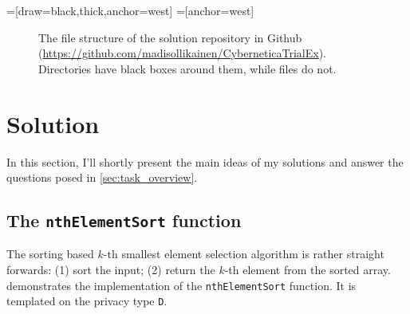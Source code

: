 \documentclass[11pt]{article}
\newcommand{\ct}[1]{\texttt{#1}}
\begin{document}
=[draw=black,thick,anchor=west]
=[anchor=west]
\begin{figure}[h]
\centering
\caption{The file structure of the solution repository in Github (\url{https://github.com/madisollikainen/CyberneticaTrialEx}). Directories have black boxes around them, while files do not.}
\label{fig:solution_file_structure}
\end{figure}




\section{Solution} %
\label{sec:solutions}

In this section, I'll shortly present the main ideas of my solutions and answer the questions posed in \cref{sec:task_overview}. 

\subsection{The \ct{nthElementSort} function} %
\label{sub:nthelementsort}

The sorting based $k$-th smallest element selection algorithm is rather straight forwards: (1) sort the input; (2) return the $k$-th element from the sorted array.  demonstrates the implementation of the \ct{nthElementSort} function. It is templated on the privacy type \ct{D}.  
\end{document}
